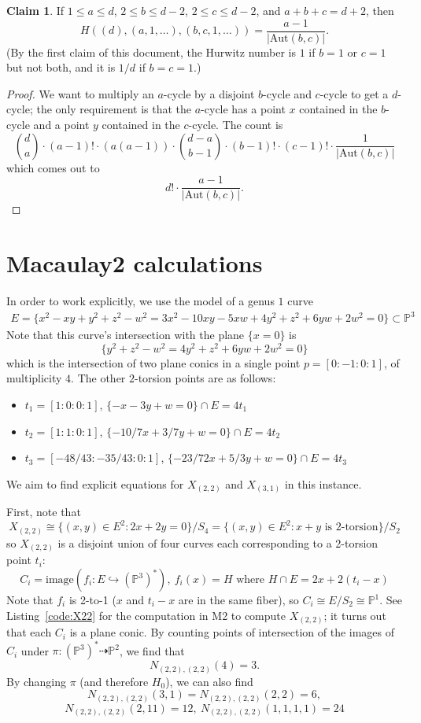 \documentclass[11pt]{article}           %
\newcommand{\Aut}{\text{Aut}}
\renewcommand{\P}{\mathbb P}
\theoremstyle{definition}
\newtheorem{claim}[thm]{Claim}
\begin{document}
\begin{claim}
  If $1\leq a\leq d$, $2\leq b\leq d-2$, $2\leq c\leq d-2$, and $a+b+c=d+2$, then
  \[
  H((d),(a,1,\dots),(b,c,1,\dots))=\frac{a-1}{|\Aut(b,c)|}.
  \]
  (By the first claim of this document, the Hurwitz number is $1$ if $b=1$ or $c=1$ but not both, and it is $1/d$ if $b=c=1$.)
\end{claim}
\begin{proof}
  We want to multiply an $a$-cycle by a disjoint $b$-cycle and $c$-cycle to get a $d$-cycle; the only
  requirement is that the $a$-cycle has a point $x$ contained in the $b$-cycle and a point $y$ contained in the
  $c$-cycle.
  The count is
  \[
  \binom da\cdot (a-1)!\cdot (a(a-1))\cdot \binom{d-a}{b-1}\cdot (b-1)!\cdot (c-1)!\cdot \frac 1{|\Aut(b,c)|}
  \]
  which comes out to
  \[
  d!\cdot\frac{a-1}{|\Aut(b,c)|}.
  \]
\end{proof}

\section{Macaulay2 calculations}
\label{appendix:code}

In order to work explicitly, we use the model of a genus $1$ curve
\begin{align*}
E=\{x^2-xy+y^2+z^2-w^2= 3x^2-10xy-5xw+4y^2+z^2+6yw+2w^2=0\}\subset\P^3
\end{align*}
Note that this curve's intersection with the plane $\{x=0\}$
is
\[
\{y^2+z^2-w^2=4y^2+z^2+6yw+2w^2=0\}
\]
which is the intersection of two plane conics in a single point $p=[0:-1:0:1]$,
of multiplicity $4$. The other $2$-torsion points are as follows:
\begin{itemize}
\item $t_1=[1:0:0:1]$, $\{-x-3y+w=0\}\cap E=4t_1$
\item $t_2=[1:1:0:1]$, $\{-10/7 x+3/7 y+w=0\}\cap E=4t_2$
  \item $t_3=[-48/43:-35/43:0:1]$, $\{-23/72 x+5/3 y+w=0\}\cap E=4t_3$
\end{itemize}
We aim to find explicit equations for $X_{(2,2)}$ and $X_{(3,1)}$ in this instance.

First, note that \[X_{(2,2)}\cong\{(x,y)\in E^2:2x+2y=0\}/S_4=\{(x,y)\in E^2:x+y\text{ is 2-torsion}\}/S_2\]
so $X_{(2,2)}$ is a disjoint union of four curves each corresponding to a 2-torsion point $t_i$:
\[
C_i=\text{image}(f_i:E\hookrightarrow(\P^3)^*),\ f_i(x)=H\text{ where }H\cap E=2x+2(t_i-x)
\]
Note that $f_i$ is 2-to-1 ($x$ and $t_i-x$ are in the same fiber), so $C_i\cong E/S_2\cong\P^1$. See Listing~\ref{code:X22} for the computation in M2 to compute $X_{(2,2)}$; it turns out that each $C_i$ is a plane conic. By counting points of
intersection of the images of $C_i$ under $\pi:(\P^3)^*\dashrightarrow\P^2$, we find that
\[
N_{(2,2),(2,2)}(4)=3.
\]
By changing $\pi$ (and therefore $H_0$), we can also find
\[
N_{(2,2),(2,2)}(3,1)=N_{(2,2),(2,2)}(2,2)=6,\]\[ N_{(2,2),(2,2)}(2,11)=12,\ N_{(2,2),(2,2)}(1,1,1,1)=24
\]
\end{document}
